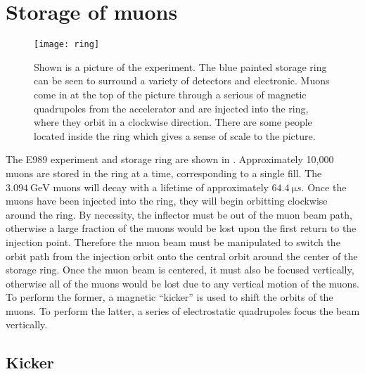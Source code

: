 \section{Storage of muons}
\label{sec:Storage}

\begin{figure}[]
    \centering
    \texttt{[image: ring]}
    \caption[The \gmtwo experiment]{Shown is a picture of the \gmtwo experiment. The blue painted storage ring can be seen to surround a variety of detectors and electronic. Muons come in at the top of the picture through a serious of magnetic quadrupoles from the accelerator and are injected into the ring, where they orbit in a clockwise direction. There are some people located inside the ring which gives a sense of scale to the picture.}   
    \label{fig:ring}
\end{figure}


The E989 experiment and storage ring are shown in . Approximately 10,000 muons are stored in the \gmtwo ring at a time, corresponding to a single fill. The $\SI{3.094}{\GeV}$ muons will decay with a lifetime of approximately $\SI{64.4}{\micro s}$. Once the muons have been injected into the ring, they will begin orbitting clockwise around the ring. By necessity, the inflector must be out of the muon beam path, otherwise a large fraction of the muons would be lost upon the first return to the injection point. Therefore the muon beam must be manipulated to switch the orbit path from the injection orbit onto the central orbit around the center of the storage ring. Once the muon beam is centered, it must also be focused vertically, otherwise all of the muons would be lost due to any vertical motion of the muons. To perform the former, a magnetic ``kicker'' is used to shift the orbits of the muons. To perform the latter, a series of electrostatic quadrupoles focus the beam vertically.

\subsection{Kicker}

